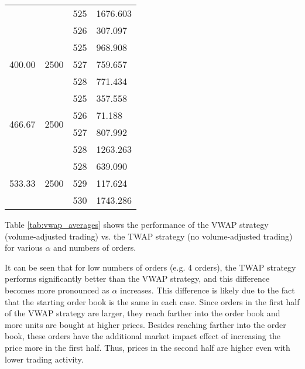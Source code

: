 \begin{table}[htbp]
\begin{center}
\begin{tabular}{l|l|l|l}
                        &                       & 525 & 1676.603 \\
                        &                       & 526 & 307.097  \\
\hline
\multirow{3}{*}{400.00} & \multirow{3}{*}{2500} & 525 & 968.908  \\
                        &                       & 527 & 759.657  \\
                        &                       & 528 & 771.434  \\
\hline
\multirow{4}{*}{466.67} & \multirow{4}{*}{2500} & 525 & 357.558  \\
                        &                       & 526 & 71.188   \\
                        &                       & 527 & 807.992  \\
                        &                       & 528 & 1263.263 \\
\hline
\multirow{3}{*}{533.33} & \multirow{3}{*}{2500} & 528 & 639.090  \\
                        &                       & 529 & 117.624  \\
                        &                       & 530 & 1743.286
\end{tabular}
\end{center}
\end{table}

Table \ref{tab:vwap_averages} shows the performance of the VWAP strategy (volume-adjusted trading) vs. the TWAP strategy (no volume-adjusted trading) for various $\alpha$ and numbers of orders. 

It can be seen that for low numbers of orders (e.g. 4 orders), the TWAP strategy performs significantly better than the VWAP strategy, and this difference becomes more pronounced as $\alpha$ increases. This difference is likely due to the fact that the starting order book is the same in each case. Since orders in the first half of the VWAP strategy are larger, they reach farther into the order book and more units are bought at higher prices. Besides reaching farther into the order book, these orders have the additional market impact effect of increasing the price more in the first half. Thus, prices in the second half are higher even with lower trading activity.

